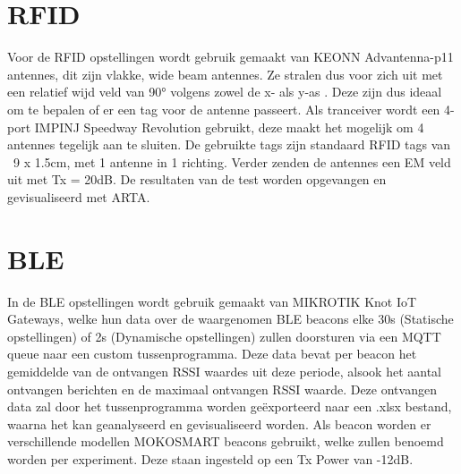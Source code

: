 \section{RFID}
Voor de RFID opstellingen wordt gebruik gemaakt van KEONN Advantenna-p11 antennes, dit zijn vlakke, wide beam antennes. Ze stralen dus voor zich uit met een relatief wijd veld van 90° volgens zowel de x- als y-as \autocite{Keonn}. Deze zijn dus ideaal om te bepalen of er een tag voor de antenne passeert.
Als tranceiver wordt een 4-port IMPINJ Speedway Revolution gebruikt, deze maakt het mogelijk om 4 antennes tegelijk aan te sluiten. De gebruikte tags zijn standaard RFID tags van ~9 x 1.5cm, met 1 antenne in 1 richting. Verder zenden de antennes een EM veld uit met Tx = 20dB. De resultaten van de test worden opgevangen en gevisualiseerd met ARTA.

\section{BLE}
In de BLE opstellingen wordt gebruik gemaakt van MIKROTIK Knot IoT Gateways, welke hun data over de waargenomen BLE beacons elke 30s (Statische opstellingen) of 2s (Dynamische opstellingen) zullen doorsturen via een MQTT queue naar een custom tussenprogramma. Deze data bevat per beacon het gemiddelde van de ontvangen RSSI waardes uit deze periode, alsook het aantal ontvangen berichten en de maximaal ontvangen RSSI waarde. Deze ontvangen data zal door het tussenprogramma worden geëxporteerd naar een .xlsx bestand, waarna het kan geanalyseerd en gevisualiseerd worden. Als beacon worden er verschillende modellen MOKOSMART beacons gebruikt, welke zullen benoemd worden per experiment. Deze staan ingesteld op een Tx Power van -12dB.





